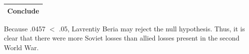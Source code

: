 \documentclass[12pt]{article}
\begin{document}
\begin{enumerate}
\begin{tabular}{l l}
        \end{tabular}

        \begin{flushleft}
          \begin{tabular}{|c|}
            \hline
            \textbf{Conclude}\\
            \hline
          \end{tabular}
        \end{flushleft}

        Because .0457 $<$ .05, Lavrentiy Beria may reject the null hypothesis. Thus, it is clear that there were more Soviet losses than allied losses present in the second World War.

\end{enumerate}
\end{document}
